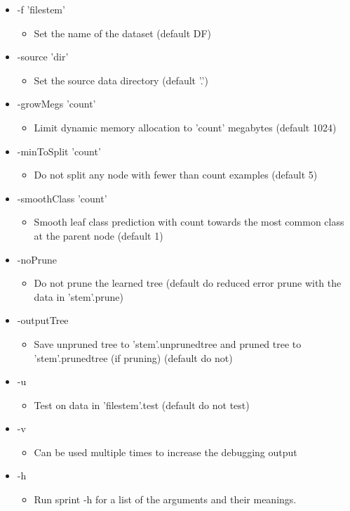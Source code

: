 \begin{itemize}
\item -f 'filestem'\begin{itemize}
\item Set the name of the dataset (default DF)\end{itemize}
\item -source 'dir'\begin{itemize}
\item Set the source data directory (default '.')\end{itemize}
\item -grow\-Megs 'count'\begin{itemize}
\item Limit dynamic memory allocation to 'count' megabytes (default 1024)\end{itemize}
\item -min\-To\-Split 'count'\begin{itemize}
\item Do not split any node with fewer than count examples (default 5)\end{itemize}
\item -smooth\-Class 'count'\begin{itemize}
\item Smooth leaf class prediction with count towards the most common class at the parent node (default 1)\end{itemize}
\item -no\-Prune\begin{itemize}
\item Do not prune the learned tree (default do reduced error prune with the data in 'stem'.prune)\end{itemize}
\item -output\-Tree\begin{itemize}
\item Save unpruned tree to 'stem'.unprunedtree and pruned tree to 'stem'.prunedtree (if pruning) (default do not)\end{itemize}
\item -u\begin{itemize}
\item Test on data in 'filestem'.test (default do not test)\end{itemize}
\item -v\begin{itemize}
\item Can be used multiple times to increase the debugging output\end{itemize}
\item -h\begin{itemize}
\item Run sprint -h for a list of the arguments and their meanings.\end{itemize}
\end{itemize}


